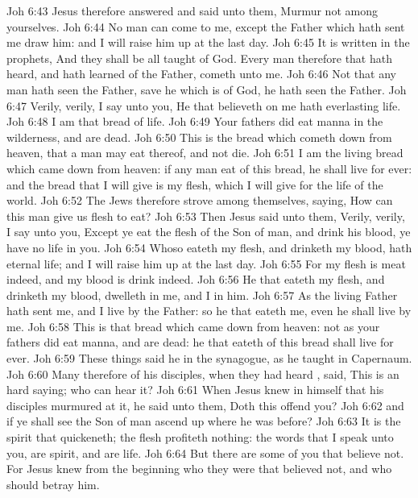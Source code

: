 \vs Joh 6:43 Jesus therefore answered and said unto them, Murmur not among yourselves.
\vs Joh 6:44 No man can come to me, except the Father which hath sent me draw him: and I will raise him up at the last day.
\vs Joh 6:45 It is written in the prophets, And they shall be all taught of God. Every man therefore that hath heard, and hath learned of the Father, cometh unto me.
\vs Joh 6:46 Not that any man hath seen the Father, save he which is of God, he hath seen the Father.
\vs Joh 6:47 Verily, verily, I say unto you, He that believeth on me hath everlasting life.
\vs Joh 6:48 I am that bread of life.
\vs Joh 6:49 Your fathers did eat manna in the wilderness, and are dead.
\vs Joh 6:50 This is the bread which cometh down from heaven, that a man may eat thereof, and not die.
\vs Joh 6:51 I am the living bread which came down from heaven: if any man eat of this bread, he shall live for ever: and the bread that I will give is my flesh, which I will give for the life of the world.
\vs Joh 6:52 The Jews therefore strove among themselves, saying, How can this man give us  flesh to eat?
\vs Joh 6:53 Then Jesus said unto them, Verily, verily, I say unto you, Except ye eat the flesh of the Son of man, and drink his blood, ye have no life in you.
\vs Joh 6:54 Whoso eateth my flesh, and drinketh my blood, hath eternal life; and I will raise him up at the last day.
\vs Joh 6:55 For my flesh is meat indeed, and my blood is drink indeed.
\vs Joh 6:56 He that eateth my flesh, and drinketh my blood, dwelleth in me, and I in him.
\vs Joh 6:57 As the living Father hath sent me, and I live by the Father: so he that eateth me, even he shall live by me.
\vs Joh 6:58 This is that bread which came down from heaven: not as your fathers did eat manna, and are dead: he that eateth of this bread shall live for ever.
\vs Joh 6:59 These things said he in the synagogue, as he taught in Capernaum.
\vs Joh 6:60 Many therefore of his disciples, when they had heard , said, This is an hard saying; who can hear it?
\vs Joh 6:61 When Jesus knew in himself that his disciples murmured at it, he said unto them, Doth this offend you?
\vs Joh 6:62  and if ye shall see the Son of man ascend up where he was before?
\vs Joh 6:63 It is the spirit that quickeneth; the flesh profiteth nothing: the words that I speak unto you,  are spirit, and  are life.
\vs Joh 6:64 But there are some of you that believe not. For Jesus knew from the beginning who they were that believed not, and who should betray him.
